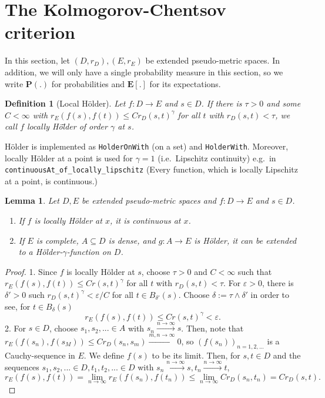 \documentclass{article}
\newtheorem{lemma}[proposition]{Lemma}
\newtheorem{definition}[proposition]{Definition}
\theoremstyle{definition}
\theoremstyle{step} \newtheorem{step}{Step}
\newcommand{\leanline}[1]{\texttt{#1}}%
\begin{document}
\section{The Kolmogorov-Chentsov criterion}
In this section, let $(D, r_D), (E, r_E)$ be extended pseudo-metric
spaces. In addition, we will only have a single probability measure in
this section, so we write $\mathbf P(.)$ for probabilities and
$\mathbf E[.]$ for its expectations.

\begin{definition}[Local Hölder]
  Let $f: D\to E$ and $s\in D$. If there is $\tau>0$ and some $C <
  \infty$ with $r_E(f(s), f(t)) \leq C r_D(s,t)^\gamma$ for all $t$
  with $r_D(s,t) < \tau$, we call $f$ \emph{locally Hö\"lder of order
    $\gamma$} at $s$.
\end{definition}

Hölder is implemented as \leanline{HolderOnWith} (on a set) and
\leanline{HolderWith}. Moreover, locally Hölder at a point is used for
$\gamma=1$ (i.e.\ Lipschitz continuity) e.g.\ in
\leanline{continuousAt_of_locally_lipschitz} (Every function, which is
locally Lipschitz at a point, is continuous.)

\begin{lemma}\label{l:holderext}
  Let $D, E$ be extended pseudo-metric spaces and $f: D\to E$ and
  $s\in D$.
  \begin{enumerate}
    \item If $f$ is locally Hölder at $x$, it is continuous at $x$.
    \item If $E$ is complete, $A \subseteq D$ is dense, and $g : A \to
      E$ is Hölder, it can be extended to a Hölder-$\gamma$-function
      on $D$.
  \end{enumerate}
\end{lemma}

\begin{proof}
  1. Since $f$ is locally Hölder at $s$, choose $\tau>0$ and
  $C<\infty$ such that $r_E(f(s), f(t)) \leq Cr(s,t)^\gamma$ for all
  $t$ with $r_D(s,t) < \tau$. For $\varepsilon>0$, there is
  $\delta'>0$ such $r_D(s,t)^\gamma < \varepsilon / C$ for all $t \in
  B_{\delta'}(s)$. Choose $\delta := \tau \wedge \delta'$ in order to
  see, for $t \in B_\delta(s)$
  $$ r_E(f(s), f(t)) \leq C r(s,t)^\gamma < \varepsilon.$$ 2. For $s
  \in D$, choose $s_1,s_2,...\in A$ with $s_n \xrightarrow{n\to\infty}
  s$. Then, note that $r_E(f(s_n), f(s_M)) \leq C r_D(s_n, s_m)
  \xrightarrow{m,n\to\infty} 0$, so $(f(s_n))_{n=1,2,...}$ is a
  Cauchy-sequence in $E$. We define $f(s)$ to be its limit. Then, for
  $s,t\in D$ and the sequences $s_1, s_2,...\in D, t_1, t_2,...\in D$
  with $s_n \xrightarrow{n\to\infty}s, t_n \xrightarrow{n\to\infty}t$,
  $$ r_E(f(s), f(t)) = \lim_{n\to\infty}r_E(f(s_n), f(t_n)) \leq
  \lim_{n\to\infty} Cr_D(s_n, t_n) = Cr_D(s,t).$$
\end{proof}
\end{document}
